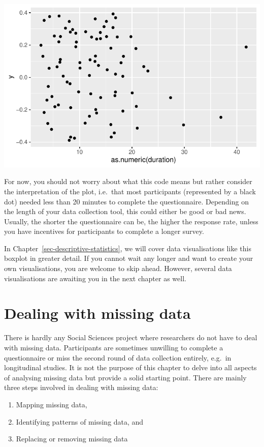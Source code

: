 \documentclass[
  letterpaper,
]{krantz}
\begin{document}
\includegraphics{07_data_wrangling_files/figure-pdf/duration-boxplot-1.pdf}

For now, you should not worry about what this code means but rather
consider the interpretation of the plot, i.e.~that most participants
(represented by a black dot) needed less than 20 minutes to complete the
questionnaire. Depending on the length of your data collection tool,
this could either be good or bad news. Usually, the shorter the
questionnaire can be, the higher the response rate, unless you have
incentives for participants to complete a longer survey.

In Chapter~\ref{sec-descriptive-statistics}, we will cover data
visualisations like this boxplot in greater detail. If you cannot wait
any longer and want to create your own visualisations, you are welcome
to skip ahead. However, several data visualisations are awaiting you in
the next chapter as well.

\section{Dealing with missing data}\label{sec-dealing-with-missing-data}

There is hardly any Social Sciences project where researchers do not
have to deal with missing data. Participants are sometimes unwilling to
complete a questionnaire or miss the second round of data collection
entirely, e.g.~in longitudinal studies. It is not the purpose of this
chapter to delve into all aspects of analysing missing data but provide
a solid starting point. There are mainly three steps involved in dealing
with missing data:

\begin{enumerate}
\def\labelenumi{\arabic{enumi}.}
\item
  Mapping missing data,
\item
  Identifying patterns of missing data, and
\item
  Replacing or removing missing data
\end{enumerate}
\end{document}
